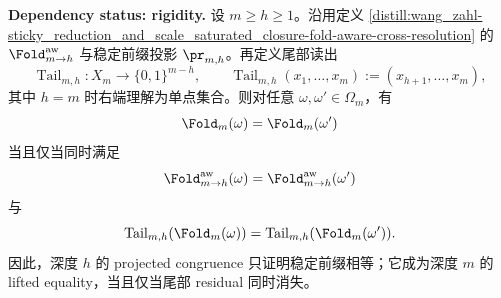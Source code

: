 \begin{proposition}\label{prop:distill-euclid-elements-fold-prefix-tail-lift-audit}
\textbf{Dependency status: rigidity.}
设 \(m\ge h\ge1\)。沿用定义 \ref{distill:wang_zahl-sticky_reduction_and_scale_saturated_closure-fold-aware-cross-resolution} 的
\(\Fold^{\rm aw}_{m\to h}\) 与稳定前缀投影 \(\pr_{m,h}\)。再定义尾部读出
\[
\operatorname{Tail}_{m,h}:X_m\longrightarrow \{0,1\}^{m-h},
\qquad
\operatorname{Tail}_{m,h}(x_1,\ldots,x_m):=(x_{h+1},\ldots,x_m),
\]
其中 \(h=m\) 时右端理解为单点集合。则对任意 \(\omega,\omega'\in\Omega_m\)，有
\[
\Fold_m(\omega)=\Fold_m(\omega')
\]
当且仅当同时满足
\[
\Fold^{\rm aw}_{m\to h}(\omega)=\Fold^{\rm aw}_{m\to h}(\omega')
\]
与
\[
\operatorname{Tail}_{m,h}(\Fold_m(\omega))
=
\operatorname{Tail}_{m,h}(\Fold_m(\omega')).
\]
因此，深度 \(h\) 的 projected congruence 只证明稳定前缀相等；它成为深度 \(m\) 的 lifted equality，当且仅当尾部 residual 同时消失。
\end{proposition}

